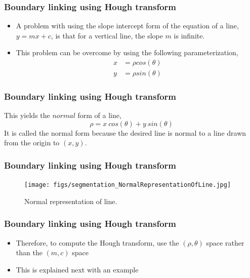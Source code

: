 \begin{frame}
\frametitle{Boundary linking using Hough transform}
\logoCSIPCPL\mypagenum
	\begin{itemize}
		\item A problem with using the slope intercept form of the equation of a line, $y=mx+c$, is that for a vertical line, the slope $m$ is infinite.
		\item This problem can be overcome by using the following parameterization,
		\begin{align*}
			x&=\rho cos(\theta)\\
			y&=\rho sin(\theta)
		\end{align*}
	\end{itemize}
\end{frame}






\begin{frame}
\frametitle{Boundary linking using Hough transform}
\logoCSIPCPL\mypagenum
	This yields the $normal$ form of a line,
	\begin{equation}
		\rho = x \ cos(\theta) + y \ sin(\theta)
	\end{equation}
	It is called the normal form because the desired line is normal to a line drawn from the origin to $(x,y)$.
\end{frame}




\begin{frame}
\frametitle{Boundary linking using Hough transform}
\logoCSIPCPL\mypagenum
	\begin{figure}[!htp]
		\texttt{[image: figs/segmentation\_NormalRepresentationOfLine.jpg]}
		\caption{Normal representation of line.}
		\label{fig:NormalRepresentationOfLine}
	\end{figure}
\end{frame}






\begin{frame}
\frametitle{Boundary linking using Hough transform}
\logoCSIPCPL\mypagenum
	\begin{itemize}
		\item Therefore, to compute the Hough transform, use the $(\rho,
		\theta)$ space rather than the $(m,c)$ space
		\item This is explained next with an example
	\end{itemize}
\end{frame}







